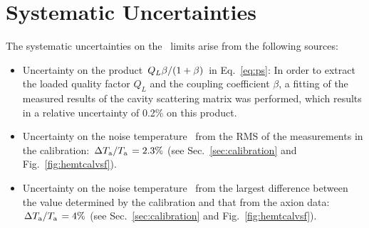 \section{Systematic Uncertainties} \label{sec:sys}
The systematic uncertainties on the \gagg\ limits arise from the 
following sources:
\begin{itemize}
\item Uncertainty on the product 
$\left.Q_L\beta\middle/\left(1+\beta\right)\right.$ in Eq.~\eqref{eq:ps}: 
In order to extract the loaded quality factor $Q_L$ and the coupling 
coefficient $\beta$, a fitting of the measured results of the cavity 
scattering matrix was performed, which results in a relative uncertainty of 
0.2\% on this product. 

\item Uncertainty on the noise temperature \ta\ from the RMS of 
the measurements in the calibration: 
$\left. \Delta T_\text{a}\middle/T_\text{a}\right.= 2.3\%$ 
(see Sec.~\ref{sec:calibration} and Fig.~\ref{fig:hemtcalvsf}).

\item Uncertainty on the noise temperature \ta\ from the largest difference 
between the value determined by the calibration and that from the axion 
data: $\left. \Delta T_\text{a}\middle/T_\text{a}\right.= 4\%$ 
(see Sec.~\ref{sec:calibration} and Fig.~\ref{fig:hemtcalvsf}). 


\end{itemize}
